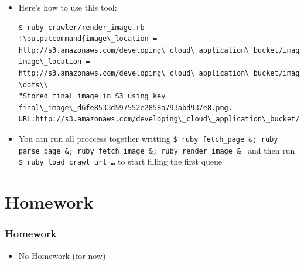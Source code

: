 \documentclass{beamer}
\newcommand{\outputcommand}[1]{\color{darkgreen}{#1|}}
\begin{document}
\begin{frame}
\begin{itemize}
\begin{lstlisting}
  output_image_name = "#{JSON.parse(msg.body)['page_title']}.#{Time.now}.png"
  key = 'final_image_' + Digest::MD5.hexdigest(output_image_name) + '.png'
  if upload_object( s3, bucket, key, output_image.to_blob, 'image/png')
    p "Stored final image in S3 using key #{key}. URL:http://s3.amazonaws.com/#{BOOK_BUCKET}/#{key}"
  else
    puts "Error uploading image #{img_url} to S3"
  end
end
\end{lstlisting}
\item Here’s how to use this tool:
\lstset{language=shell}
\begin{lstlisting}[escapechar=!]
$ ruby crawler/render_image.rb 
!\outputcommand{image\_location = http://s3.amazonaws.com/developing\_cloud\_application\_bucket/image\_bfd43e28e9c24b6aa58be89ca9ddf2c1.png\\
image\_location = http://s3.amazonaws.com/developing\_cloud\_application\_bucket/image\_f65b5f3577de03898c83e8d56df44d0a.png\\
\dots\\
"Stored final image in S3 using key final\_image\_d6fe8533d597552e2858a793abd937e8.png. URL:http://s3.amazonaws.com/developing\_cloud\_application\_bucket/final\_image\_d6fe8533d597552e2858a793abd937e8.png"}!
\end{lstlisting}

\item You can run all proccess together writting \texttt{\$ ruby fetch\_page \&; ruby parse\_page \&; ruby fetch\_image \&; ruby render\_image \& } and then run \texttt{\$ ruby load\_crawl\_url \dots} to start filling the first queue
\end{itemize}

\end{frame}
\section{Homework}
\begin{frame}[fragile]
\frametitle{Homework}
\begin{itemize}
\item No Homework (for now)
\end{itemize}
\end{frame}
\end{document}
